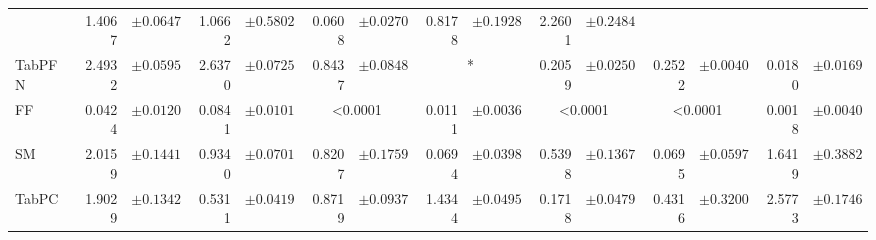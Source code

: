 \begin{table}[htbp]
{\begin{tabular}{
l
r@{}l
r@{}l
r@{}l
r@{}l
r@{}l
r@{}l
r@{}l
}
 & 1.4067 & \footnotesize{$\pm 0.0647$}
 & 1.0662 & \footnotesize{$\pm 0.5802$}
 & 0.0608 & \footnotesize{$\pm 0.0270$}
 & 0.8178 & \footnotesize{$\pm 0.1928$}
 & 2.2601 & \footnotesize{$\pm 0.2484$}
 \\
    TabPFN & 2.4932 & \footnotesize{$\pm 0.0595$}
 & 2.6370 & \footnotesize{$\pm 0.0725$}
 & 0.8437 & \footnotesize{$\pm 0.0848$}
 & \multicolumn{2}{c}{*} & 0.2059 & \footnotesize{$\pm 0.0250$}
 & 0.2522 & \footnotesize{$\pm 0.0040$}
 & 0.0180 & \footnotesize{$\pm 0.0169$}
 \\
    \midrule
    FF & 0.0424 & \footnotesize{$\pm 0.0120$}
 & 0.0841 & \footnotesize{$\pm 0.0101$}
 & \multicolumn{2}{c}{<0.0001} & 0.0111 & \footnotesize{$\pm 0.0036$}
 & \multicolumn{2}{c}{<0.0001} & \multicolumn{2}{c}{<0.0001} & 0.0018 & \footnotesize{$\pm 0.0040$}
 \\
    SM & 2.0159 & \footnotesize{$\pm 0.1441$}
 & 0.9340 & \footnotesize{$\pm 0.0701$}
 & 0.8207 & \footnotesize{$\pm 0.1759$}
 & 0.0694 & \footnotesize{$\pm 0.0398$}
 & 0.5398 & \footnotesize{$\pm 0.1367$}
 & 0.0695 & \footnotesize{$\pm 0.0597$}
 & 1.6419 & \footnotesize{$\pm 0.3882$}
 \\
    TabPC & 1.9029 & \footnotesize{$\pm 0.1342$}
 & 0.5311 & \footnotesize{$\pm 0.0419$}
 & 0.8719 & \footnotesize{$\pm 0.0937$}
 & 1.4344 & \footnotesize{$\pm 0.0495$}
 & 0.1718 & \footnotesize{$\pm 0.0479$}
 & 0.4316 & \footnotesize{$\pm 0.3200$}
 & 2.5773 & \footnotesize{$\pm 0.1746$}
 \\
    \bottomrule[1.0pt]
\end{tabular}}
\end{table}
